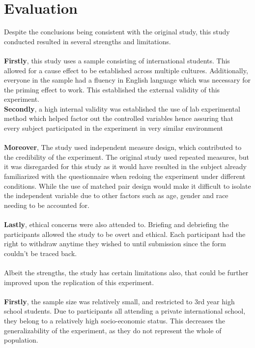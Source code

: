 \documentclass[11pt]{article}
\begin{document}
\section{Evaluation}
Despite the conclusions being consistent with the original study, this study conducted resulted in several strengths and limitations. 
\\\\
\textbf{Firstly}, this study uses a sample consisting of international students. This allowed for a cause effect to be established across multiple cultures. Additionally, everyone in the sample
had a fluency in English language which was necessary for the priming effect to work. This established the external validity of this experiment.
\\
\textbf{Secondly}, a high internal validity was established the use of lab experimental method which helped factor out the controlled variables hence assuring that every subject participated in the experiment in very similar environment\\
\\
\textbf{Moreover}, The study used independent measure design, which contributed to the credibility of the experiment. The original study used repeated measures, but it was disregarded for this study as it would have resulted in the subject already familiarized
with the questionnaire when redoing the experiment under different conditions. While the use of matched pair design would make it difficult to isolate the independent variable due to other factors such as age, gender and race needing to be accounted for.\\
\\
\textbf{Lastly}, ethical concerns were also attended to. Briefing and debriefing the participants allowed the study to be overt and ethical. Each participant had the right to withdraw anytime they wished to until submission since the form couldn't be traced back.
\\\\
Albeit the strengths, the study has certain limitations also, that could be further improved upon the replication of this experiment. 
\\\\
\textbf{Firstly}, the sample size was relatively small, and restricted to 3rd year high school students. Due to participants all attending a private international school, they belong to a relatively high socio-economic status.
This decreases the generalizability of the experiment, as they do not represent the whole of population.
\end{document}
